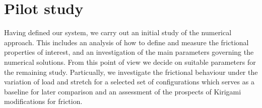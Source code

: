 


\chapter{Pilot study}
Having defined our system, we carry out an initial study of the numerical approach. This includes an analysis of how to define and measure the frictional properties of interest, and an investigation of the main parameters governing the numerical solutions. From this point of view we decide on suitable parameters for the remaining study. Particually, we investigate the frictional behaviour under the variation of load and stretch for a selected set of configurations which serves as a baseline for later comparison and an assessment of the prospects of Kirigami modifications for friction. 


